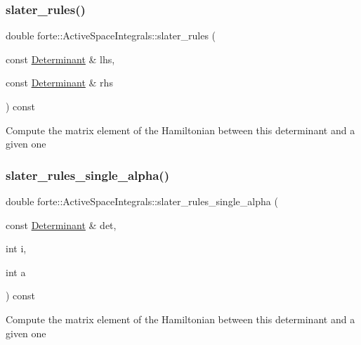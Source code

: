 \subsubsection{\texorpdfstring{slater\+\_\+rules()}{slater\_rules()}}
{\footnotesize\ttfamily double forte\+::\+Active\+Space\+Integrals\+::slater\+\_\+rules (\begin{DoxyParamCaption}\item[{const \mbox{\hyperlink{namespaceforte_a2076c63fd7b8732004d9e1442ce527c1}{Determinant}} \&}]{lhs,  }\item[{const \mbox{\hyperlink{namespaceforte_a2076c63fd7b8732004d9e1442ce527c1}{Determinant}} \&}]{rhs }\end{DoxyParamCaption}) const}

Compute the matrix element of the Hamiltonian between this determinant and a given one \mbox{\label{classforte_1_1_active_space_integrals_a2b03f0580818ada3774a48366057bfdf}} 
\subsubsection{\texorpdfstring{slater\+\_\+rules\+\_\+single\+\_\+alpha()}{slater\_rules\_single\_alpha()}}
{\footnotesize\ttfamily double forte\+::\+Active\+Space\+Integrals\+::slater\+\_\+rules\+\_\+single\+\_\+alpha (\begin{DoxyParamCaption}\item[{const \mbox{\hyperlink{namespaceforte_a2076c63fd7b8732004d9e1442ce527c1}{Determinant}} \&}]{det,  }\item[{int}]{i,  }\item[{int}]{a }\end{DoxyParamCaption}) const}

Compute the matrix element of the Hamiltonian between this determinant and a given one \mbox{\label{classforte_1_1_active_space_integrals_abbf6bf916c0d561ce88001fed3b6967a}} 
